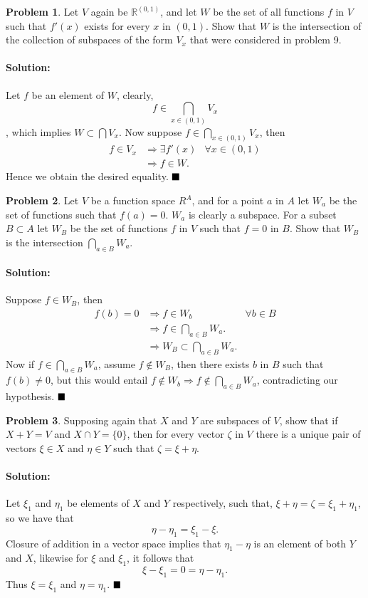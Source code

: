 \documentclass[]{article}
\newcommand{\RR}{\mathbb{R}}
\theoremstyle{definition}
\newtheorem{problem}{Problem}
\newenvironment{solution}{\paragraph{Solution:}}{\hfill$\blacksquare \\$}
\begin{document}
\begin{problem}
Let $V$ again be $\RR^{(0,1)}$, and let $W$ be the set of all functions $f$ in $V$ such that $f'(x)$ exists for every $x$ in $(0,1)$. Show that $W$ is the intersection of the collection of subspaces of the form $V_x$ that were considered in problem 9.	
\end{problem}
\begin{solution}
	Let $f$ be an element of $W$, clearly, \[f \in \bigcap_{x \in (0,1)} V_x \], which implies $W \subset \bigcap V_x$. Now suppose $f \in \bigcap_{x\in(0,1)} V_x$, then
	\begin{align*}
		f \in V_x & \Rightarrow \exists f'(x)  & \forall x \in (0,1) \\
		& \Rightarrow f \in W.
	\end{align*}
	Hence we obtain the desired equality.
\end{solution}
\begin{problem}
	Let $V$ be a function space $R^A$, and for a point $a$ in $A$ let $W_a$ be the set of functions such that $f(a) = 0$. $W_a$ is clearly a subspace. For a subset $B \subset A$ let $W_B$ be the set of functions $f$ in $V$ such that $f = 0$ in $B$. Show that $W_B$ is the intersection $\bigcap_{a \in B} W_a$.
\end{problem}
\begin{solution}
	Suppose $f \in W_B$, then
	\begin{align*}
		f(b) = 0 &\Rightarrow f \in W_b & \forall b \in B \\
		& \Rightarrow f \in \bigcap_{a \in B} W_a. & \\
		& \Rightarrow W_B \subset \bigcap_{a \in B} W_a. &
	\end{align*}
Now if $f \in \bigcap_{a \in B} W_a$, assume $f \notin W_B$, then there exists $b$ in $B$ such that $f(b) \neq 0$, but this would entail $f \notin W_b \Rightarrow f \notin \bigcap_{a \in B} W_a$, contradicting our hypothesis.
\end{solution}
\begin{problem}
	Supposing again that $X$ and $Y$ are subspaces of $V$, show that if $X+Y = V$ and $X \cap Y = \{0\}$, then for every vector $\zeta$ in $V$ there is a unique pair of vectors $\xi \in X$ and $\eta \in Y$ such that $\zeta = \xi + \eta$.
\end{problem}
\begin{solution}
	Let $\xi_1$ and  $\eta_1$ be elements of $X$ and $Y$ respectively, such that, $\xi + \eta = \zeta = \xi_1 + \eta_1$, so we have that 	\[
	\eta - \eta_1 = \xi_1 - \xi.
	\]
	Closure of addition in a vector space implies that $\eta_1 - \eta$ is an element of both $Y$ and $X$, likewise for $\xi$ and $\xi_1$, it follows that 
	\[
	\xi - \xi_1 = 0  = \eta - \eta_1.
	\]
	Thus $\xi = \xi_1$ and $\eta = \eta_1$.
\end{solution}
\end{document}
